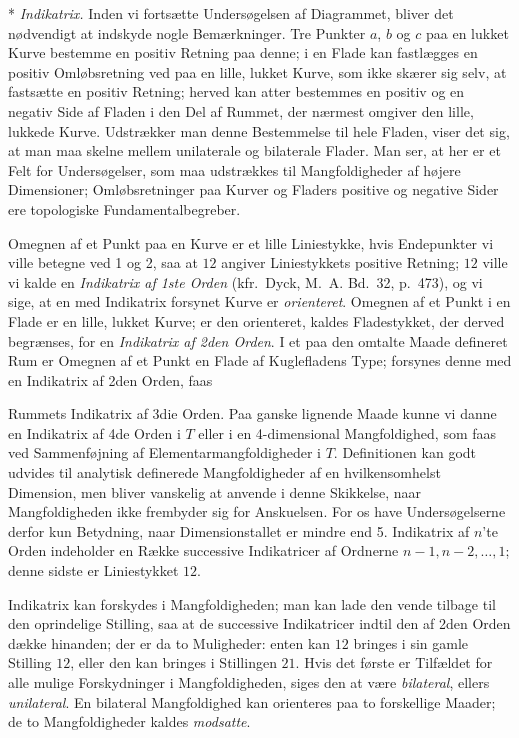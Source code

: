 \documentclass{article}
\begin{document}
* \emph{Indikatrix.} Inden vi fortsætte Undersøgelsen af Diagrammet, bliver det nødvendigt at indskyde nogle Bemærkninger. Tre Punkter $a$, $b$ og $c$ paa en lukket Kurve bestemme en positiv Retning paa denne; i en Flade kan fastlægges en positiv Omløbsretning ved paa en lille, lukket Kurve, som ikke skærer sig selv, at fastsætte en positiv Retning; herved kan atter bestemmes en positiv og en negativ Side af Fladen i den Del af Rummet, der nærmest omgiver den lille, lukkede Kurve. Udstrækker man denne Bestemmelse til hele Fladen, viser det sig, at man maa skelne mellem unilaterale og bilaterale Flader. Man ser, at her er et Felt for Undersøgelser, som maa udstrækkes til Mangfoldigheder af højere Dimensioner; Omløbsretninger paa Kurver og Fladers positive og negative Sider ere topologiske Fundamentalbegreber.

Omegnen af et Punkt paa en Kurve er et lille Liniestykke, hvis Endepunkter vi ville betegne ved 1 og 2, saa at $12$ angiver Liniestykkets positive Retning; $12$ ville vi kalde en \emph{Indikatrix af 1ste Orden} (kfr.\ Dyck, M.~A. Bd.\ 32, p.\ 473), og vi sige, at en med Indikatrix forsynet Kurve er \emph{orienteret}. Omegnen af et Punkt i en Flade er en lille, lukket Kurve; er den orienteret, kaldes Fladestykket, der derved begrænses, for en \emph{Indikatrix af 2den Orden}. I et paa den omtalte Maade defineret Rum er Omegnen af et Punkt en Flade af Kuglefladens Type; forsynes denne med en Indikatrix af 2den Orden, faas

Rummets Indikatrix af 3die Orden. Paa ganske lignende Maade kunne vi danne en Indikatrix af 4de Orden i $T$ eller i en 4-dimensional Mangfoldighed, som faas ved Sammenføjning af Elementarmangfoldigheder i $T$. Definitionen kan godt udvides til analytisk definerede Mangfoldigheder af en hvilkensomhelst Dimension, men bliver vanskelig at anvende i denne Skikkelse, naar Mangfoldigheden ikke frembyder sig for Anskuelsen. For os have Undersøgelserne derfor kun Betydning, naar Dimensionstallet er mindre end 5. Indikatrix af $n$'te Orden indeholder en Række successive Indikatricer af Ordnerne $n - 1, n - 2, \dots, 1$; denne sidste er Liniestykket $12$.

Indikatrix kan forskydes i Mangfoldigheden; man kan lade den vende tilbage til den oprindelige Stilling, saa at de successive Indikatricer indtil den af 2den Orden dække hinanden; der er da to Muligheder: enten kan $12$ bringes i sin gamle Stilling $12$, eller den kan bringes i Stillingen $21$. Hvis det første er Tilfældet for alle mulige Forskydninger i Mangfoldigheden, siges den at være \emph{bilateral}, ellers \emph{unilateral}. En bilateral Mangfoldighed kan orienteres paa to forskellige Maader; de to Mangfoldigheder kaldes \emph{modsatte}.
\end{document}

